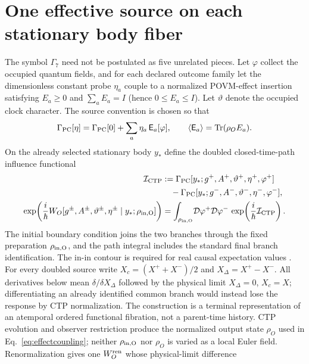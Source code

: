 \documentclass[11pt]{article}
\begin{document}
\section{One effective source on each stationary body fiber}

The symbol $\Gamma_7$ need not be postulated as five unrelated pieces.  Let
$\varphi$ collect the occupied quantum fields, and for each declared outcome
family let the dimensionless constant probe $\eta_a$ couple to a normalized
POVM-effect insertion satisfying
$E_a\geq0$ and $\sum_aE_a=I$ (hence $0\leq E_a\leq I$).  Let $\vartheta$
denote the occupied clock character.  The source convention is chosen so that
\begin{equation}
\Gamma_{\rm PC}[\eta]
=\Gamma_{\rm PC}[0]+\sum_a\eta_a\,\mathsf E_a[\varphi],
\qquad
\langle\mathsf E_a\rangle=\operatorname{Tr}(\rho_OE_a).
\label{eq:effectcoupling}
\end{equation}
On the already selected stationary body $y_*$ define the doubled
closed-time-path influence functional
\begin{align}
\mathcal I_{\rm CTP}
&:=\Gamma_{\rm PC}[y_*;g^+,A^+,\vartheta^+,\eta^+,\varphi^+]\notag\\
&\quad-\Gamma_{\rm PC}[y_*;g^-,A^-,\vartheta^-,\eta^-,\varphi^-],
\label{eq:ctpaction}\\
\exp\!\left({i\over\hbar}W_O[g^\pm,A^\pm,\vartheta^\pm,\eta^\pm
\mid y_*;\rho_{\rm in,O}]\right)
&=\int_{\rho_{\rm in,O}}\!\mathcal D\varphi^+\mathcal D\varphi^-\,
\exp\!\left({i\over\hbar}\mathcal I_{\rm CTP}\right).
\label{eq:ineffective}
\end{align}
The initial boundary condition joins the two branches through the fixed
preparation $\rho_{\rm in,O}$, and the path integral includes the standard
final branch identification.  The in-in contour is required for real causal expectation
values \citep{Schwinger1961,Keldysh1965}.  For every doubled source write
$X_c=(X^++X^-)/2$ and $X_\Delta=X^+-X^-$.  All derivatives below mean
$\delta/\delta X_\Delta$ followed by the physical limit
$X_\Delta=0$, $X_c=X$; differentiating an already identified common branch
would instead lose the response by CTP normalization.  The construction is a
terminal representation of an atemporal ordered functional fibration, not a
parent-time history.  CTP evolution and observer restriction produce the
normalized output state $\rho_O$ used in Eq.~\eqref{eq:effectcoupling}; neither
$\rho_{\rm in,O}$ nor $\rho_O$ is varied as a local Euler field.
Renormalization gives one $W_O^{\rm ren}$ whose physical-limit difference
\end{document}

